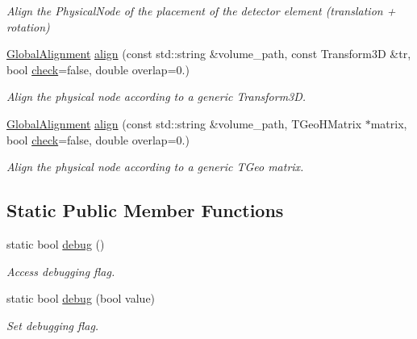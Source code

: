 \begin{DoxyCompactItemize}
\begin{DoxyCompactList}\small\item\em Align the Physical\+Node of the placement of the detector element (translation + rotation) \end{DoxyCompactList}\item 
\hyperlink{class_d_d4hep_1_1_alignments_1_1_global_alignment}{Global\+Alignment} \hyperlink{class_d_d4hep_1_1_alignments_1_1_global_detector_alignment_ad269df33b11aa03911a8dd72512eba7b}{align} (const std\+::string \&volume\+\_\+path, const Transform3D \&tr, bool \hyperlink{class_d_d4hep_1_1_geometry_1_1_det_element_aee32c6df93ab1cb7d6dc36e7ae855112}{check}=false, double overlap=0.)
\begin{DoxyCompactList}\small\item\em Align the physical node according to a generic Transform3D. \end{DoxyCompactList}\item 
\hyperlink{class_d_d4hep_1_1_alignments_1_1_global_alignment}{Global\+Alignment} \hyperlink{class_d_d4hep_1_1_alignments_1_1_global_detector_alignment_ae189ba965c23303f0b1f475a0629c164}{align} (const std\+::string \&volume\+\_\+path, T\+Geo\+H\+Matrix $\ast$matrix, bool \hyperlink{class_d_d4hep_1_1_geometry_1_1_det_element_aee32c6df93ab1cb7d6dc36e7ae855112}{check}=false, double overlap=0.)
\begin{DoxyCompactList}\small\item\em Align the physical node according to a generic T\+Geo matrix. \end{DoxyCompactList}\end{DoxyCompactItemize}
\subsection*{Static Public Member Functions}
\begin{DoxyCompactItemize}
\item 
static bool \hyperlink{class_d_d4hep_1_1_alignments_1_1_global_detector_alignment_aeb175ec1d0dede0976111a2887c17fd6}{debug} ()
\begin{DoxyCompactList}\small\item\em Access debugging flag. \end{DoxyCompactList}\item 
static bool \hyperlink{class_d_d4hep_1_1_alignments_1_1_global_detector_alignment_af14b48c2d73add10f4b9dff410d6a5e0}{debug} (bool value)
\begin{DoxyCompactList}\small\item\em Set debugging flag. \end{DoxyCompactList}\end{DoxyCompactItemize}
